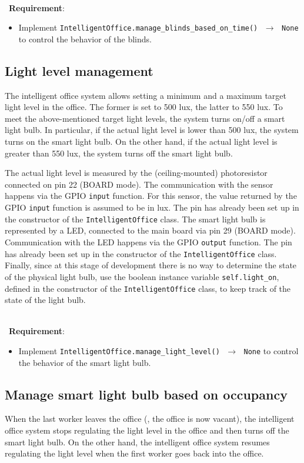 \ \\ \
\noindent\textbf{Requirement}:
\begin{itemize}
    \item Implement \texttt{IntelligentOffice.manage\_blinds\_based\_on\_time() $\,\to\,$ None} to control the behavior of the blinds.
\end{itemize}


\subsection{Light level management}
The intelligent office system allows setting a minimum and a maximum target light level in the office. The former is set to 500 lux, the latter to 550 lux. 
To meet the above-mentioned target light levels, the system turns on/off a smart light bulb. In particular, if the actual light level is lower than 500 lux, the system turns on the smart light bulb. On the other hand, if the actual light level is greater than 550 lux, the system turns off the smart light bulb. 

The actual light level is measured by the (ceiling-mounted) photoresistor connected on pin 22 (BOARD mode). The communication with the sensor happens via the GPIO \texttt{input} function. For this sensor, the value returned by the GPIO \texttt{input} function is assumed to be in lux. The pin has already been set up in the constructor of the \texttt{IntelligentOffice} class. 
The smart light bulb is represented by a LED, connected to the main board via pin 29 (BOARD mode). Communication with the LED happens via the GPIO \texttt{output} function. The pin has already been set up in the constructor of  the \texttt{IntelligentOffice} class.
Finally, since at this stage of development there is no way to determine the state of the physical light bulb, use the boolean instance variable \texttt{self.light\_on}, defined in the constructor of the \texttt{IntelligentOffice} class, to keep track of the state of the light bulb.

\ \\ \
\noindent\textbf{Requirement}:
\begin{itemize}
    \item Implement \texttt{IntelligentOffice.manage\_light\_level() $\,\to\,$ None} to control the behavior of the smart light bulb.
\end{itemize}


\subsection{Manage smart light bulb based on occupancy}
When the last worker leaves the office (\ie, the office is now vacant), the intelligent office system stops regulating the light level in the office and then turns off the smart light bulb. 
On the other hand, the intelligent office system resumes regulating the light level when the first worker goes back into the office. 

